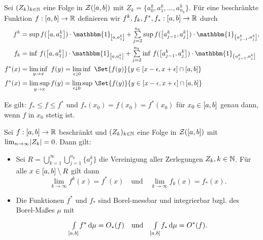 \documentclass{cheat-sheet}
\newcommand{\ind}{\mathbbm{1}} %
\theoremstyle{definition}
\begin{document}
\begin{nota}
  Sei $(Z_k)_{k \in \mathbb{N}}$ eine Folge in $\mathcal{Z}(\left[ a, b \right])$ mit $Z_k = \{ a_0^k, a_1^k, \ldots, a^k_{n_k} \}$. Für eine beschränkte Funktion $f : \left[ a, b \right] \to \mathbb{R}$ definieren wir $f^k, f_k, f^*, f_* : \left[ a, b \right] \to \mathbb{R}$ durch
  \begin{align*}
    f^k &= \sup f(\cinterval{a}{a_1^k}) \cdot \ind_{\cinterval{a}{a_1^k}} + \sum_{j=2}^{n_k} \sup f(\cinterval{a_{j-1}^k}{a_j^k}) \cdot \ind_{\ocinterval{a_{j-1}^k}{a_j^k}},\\
    f_k &= \inf \, f(\cinterval{a}{a_1^k}) \cdot \ind_{\cinterval{a}{a_1^k}} + \sum_{j=2}^{n_k} \inf \, f(\cinterval{a_{j-1}^k}{a_j^k}) \cdot \ind_{\ocinterval{a_{j-1}^k}{a_j^k}}\\
    f^*(x) &= \liminf_{y \to x}\,\, f(y) = \lim_{\epsilon \downarrow 0} \inf\,\, \Set{ f(y) }{ y \in [x-\epsilon, x+\epsilon] \cap \cinterval{a}{b}}\\
    f^*(x) &= \limsup_{y \to x} f(y) = \lim_{\epsilon \downarrow 0} \sup \, \Set{ f(y) }{ y \in [x-\epsilon, x+\epsilon] \cap \cinterval{a}{b}}
  \end{align*}
\end{nota}

\begin{bem}
  Es gilt: $f_* \leq f \leq f^*$ und $f_*(x_0) = f(x_0) = f^*(x_0)$ für $x_0 \in \left[ a, b \right]$ genau dann, wenn $f$ in $x_0$ stetig ist.
\end{bem}

\begin{satz}
  Sei $f : \left[ a, b \right] \to \mathbb{R}$ beschränkt und $(Z_k)_{k \in \mathbb{N}}$ eine Folge in $\mathcal{Z}(\left[ a, b \right])$ mit $\lim_{n \to \infty} \lvert Z_k\rvert = 0$. Dann gilt:
  \begin{itemize}
    \item Sei $R = \bigcup_{k=1}^\infty \bigcup_{j=1}^{n_k} \{ a_j^k \}$ die Vereinigung aller Zerlegungen $Z_k, k \in \mathbb{N}$. Für alle $x \in \left[ a, b \right] \setminus R$ gilt dann
    \[
      \lim_{k \to \infty} f^k(x) = f^*(x)
      \quad \text{und} \quad
      \lim_{k \to \infty} f_k(x) = f_*(x).
    \]
    \item Die Funktionen $f^*$ und $f_*$ sind Borel-messbar und integrierbar bzgl. des Borel-Maßes $\mu$ mit
    \[ {\textstyle \int\limits_{\left[ a, b \right]}^{}} f^* \,\mathrm{d} \mu = O_*(f) \quad \text{und} \quad {\textstyle \int\limits_{\left[ a, b \right]}^{}} f_* \,\mathrm{d} \mu = O^*(f). \]
  \end{itemize}
\end{satz}
\end{document}
